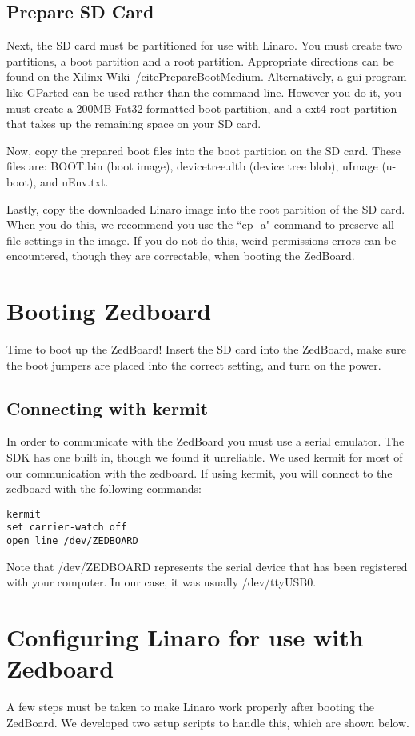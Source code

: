 \documentclass[thesis.tex]{subfile}
\begin{document}
\subsection{Prepare SD Card}
Next, the SD card must be partitioned for use with Linaro. You must create two partitions, a boot partition and a root partition. Appropriate directions can be found on the Xilinx Wiki~/cite{PrepareBootMedium}. Alternatively, a \gls{gui} program like GParted can be used rather than the command line. However you do it, you must create a 200MB Fat32 formatted boot partition, and a ext4 root partition that takes up the remaining space on your SD card.

Now, copy the prepared boot files into the boot partition on the SD card. These files are: BOOT.bin (boot image), devicetree.dtb (device tree blob), uImage (u-boot), and uEnv.txt.

Lastly, copy the downloaded Linaro image into the root partition of the SD card. When you do this, we recommend you use the ``cp -a" command to preserve all file settings in the image. If you do not do this, weird permissions errors can be encountered, though they are correctable, when booting the ZedBoard.

\section{Booting Zedboard}
Time to boot up the ZedBoard! Insert the SD card into the ZedBoard, make sure the boot jumpers are placed into the correct setting, and turn on the power.

\subsection{Connecting with kermit}
In order to communicate with the ZedBoard you must use a serial emulator. The SDK has one built in, though we found it unreliable. We used kermit for most of our communication with the zedboard. If using kermit, you will connect to the zedboard with the following commands:
\begin{lstlisting}
kermit
set carrier-watch off
open line /dev/ZEDBOARD
\end{lstlisting}
Note that /dev/ZEDBOARD represents the serial device that has been registered with your computer. In our case, it was usually /dev/ttyUSB0.

\section{Configuring Linaro for use with Zedboard}
A few steps must be taken to make Linaro work properly after booting the ZedBoard. We developed two setup scripts to handle this, which are shown below.
\end{document}

